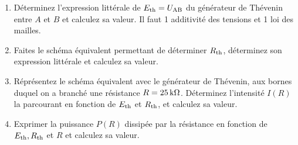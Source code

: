 \documentclass[10pt,a4paper]{article}
\begin{document}
\begin{enumerate}[label=\color{brandeisblue}\arabic*), resume]
    \item Déterminez l'expression littérale de $E _{\text{th}} = U _{\text{AB}}$ du
        générateur de Thévenin entre $A$ et $B$ et calculez sa valeur. Il faut 1
        additivité des tensions et 1 loi des mailles.
        \vspace{3cm}
    \item Faites le schéma équivalent permettant de déterminer $R _{\text{th}}$,
        déterminez son expression littérale et calculez sa valeur.
        \vspace{3cm}
    \item Réprésentez le schéma équivalent avec le générateur de Thévenin,
        aux bornes duquel on a branché une résistance $R = \SI{25}{k\Omega}$.
        Déterminez l'intensité $I(R)$ la parcourant en fonction de $E _{\text{th}}$
        et $R _{\text{th}}$, et calculez sa valeur.
        \vspace{3cm}
    \item Exprimer la puissance $P(R)$ dissipée par la résistance en fonction de
        $E _{\text{th}}, R _{\text{th}}$ et $R$ et calculez sa valeur.
\end{enumerate}
\end{document}
